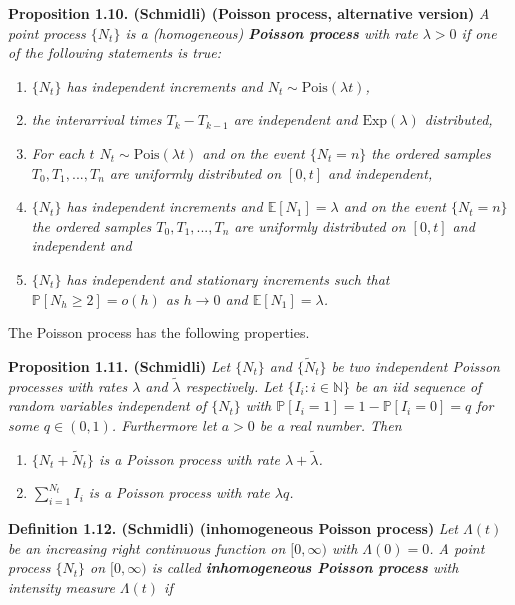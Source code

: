\documentclass[a4paper,10pt,openany]{book}
\providecommand{\tightlist}{%
 \setlength{\itemsep}{0pt}\setlength{\parskip}{0pt}}
\begin{document}
\textbf{Proposition 1.10. (Schmidli) (Poisson process, alternative version)} \emph{A point process \(\{N_t\}\) is a (homogeneous) \textbf{Poisson process} with rate \(\lambda >0\) if one of the following statements is true:}

\begin{enumerate}
\def\labelenumi{\roman{enumi})}
\tightlist
\item
  \emph{\(\{N_t\}\) has independent increments and \(N_t\sim \text{Pois}(\lambda t)\),}
\item
  \emph{the interarrival times \(T_k-T_{k-1}\) are independent and \(\text{Exp}(\lambda)\) distributed,}
\item
  \emph{For each \(t\) \(N_t\sim \text{Pois}(\lambda t)\) and on the event \(\{N_t=n\}\) the ordered samples \(T_0,T_1,...,T_n\) are uniformly distributed on \([0,t]\) and independent,}
\item
  \emph{\(\{N_t\}\) has independent increments and \(\mathbb E[N_1]=\lambda\) and on the event \(\{N_t=n\}\) the ordered samples \(T_0,T_1,...,T_n\) are uniformly distributed on \([0,t]\) and independent and}
\item
  \emph{\(\{N_t\}\) has independent and stationary increments such that \(\mathbb P[N_h\ge 2]=o(h)\) as \(h\to 0\) and \(\mathbb E[N_1]=\lambda\).}
\end{enumerate}

The Poisson process has the following properties.

\textbf{Proposition 1.11. (Schmidli)} \emph{Let \(\{N_t\}\) and \(\{\tilde N_t\}\) be two independent Poisson processes with rates \(\lambda\) and \(\tilde\lambda\) respectively. Let \(\{I_i : i \in \mathbb N\}\) be an iid sequence of random variables independent of \(\{N_t\}\) with \(\mathbb P[I_i = 1] = 1−\mathbb P[I_i = 0] = q\) for some \(q \in (0,1)\). Furthermore let \(a > 0\) be a real number. Then}

\begin{enumerate}
\def\labelenumi{\roman{enumi})}
\tightlist
\item
  \emph{\(\{N_t+\tilde N_t\}\) is a Poisson process with rate \(\lambda +\tilde \lambda\).}
\item
  \emph{\(\sum_{i=1}^{N_t}I_i\) is a Poisson process with rate \(\lambda q\).}
\end{enumerate}

\textbf{Definition 1.12. (Schmidli) (inhomogeneous Poisson process)} \emph{Let \(\Lambda(t)\) be an increasing right continuous function on \([0,\infty)\) with \(\Lambda(0) = 0\). A point process \(\{N_t\}\) on \([0, \infty)\) is called \textbf{inhomogeneous Poisson process} with intensity measure \(\Lambda(t)\) if}
\end{document}
